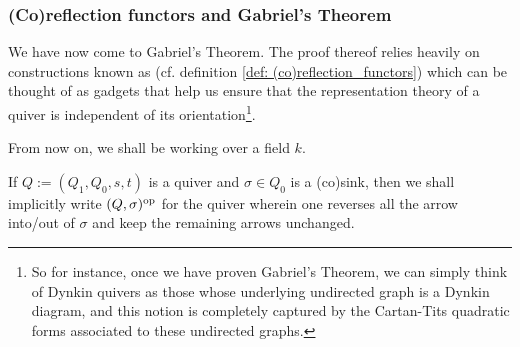         \subsubsection{(Co)reflection functors and Gabriel's Theorem}
            We have now come to Gabriel's Theorem. The proof thereof relies heavily on constructions known as  (cf. definition \ref{def: (co)reflection_functors}) which can be thought of as gadgets that help us ensure that the representation theory of a quiver is independent of its orientation\footnote{So for instance, once we have proven Gabriel's Theorem, we can simply think of Dynkin quivers as those whose underlying undirected graph is a Dynkin diagram, and this notion is completely captured by the Cartan-Tits quadratic forms associated to these undirected graphs.}. 
            \begin{convention}
                From now on, we shall be working over a field $k$. 
            \end{convention}
            \begin{definition}[(Co)sinks] \label{def: (co)sinks}
                
            \end{definition}
            \begin{convention}
                If $Q := (Q_1, Q_0, s, t)$ is a quiver and $\sigma \in Q_0$ is a (co)sink, then we shall implicitly write $(Q, \sigma)^{\mathrm{op}}$ for the quiver wherein one reverses all the arrow into/out of $\sigma$ and keep the remaining arrows unchanged.
            \end{convention}
